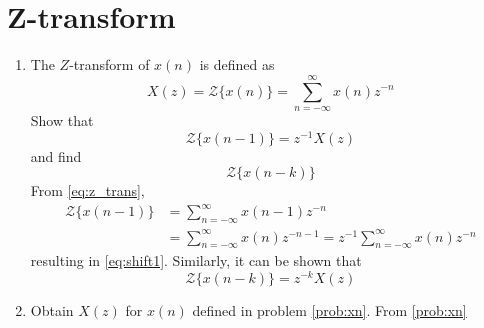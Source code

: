 \documentclass[journal,12pt,twocolumn]{IEEEtran}
\renewcommand\thesection{\arabic{section}}
\begin{document}
\section{Z-transform}
\begin{enumerate}[label=\thesection.\arabic*]
\item The $Z$-transform of $x(n)$ is defined as
%
\begin{equation}
	\label{eq:z_trans}
	X(z)={\mathcal {Z}}\{x(n)\}=\sum _{n=-\infty }^{\infty }x(n)z^{-n}
\end{equation}
%
Show that
\begin{equation}
	\label{eq:shift1}
	{\mathcal {Z}}\{x(n-1)\} = z^{-1}X(z)
\end{equation}
and find
\begin{equation}
	{\mathcal {Z}}\{x(n-k)\} 
\end{equation}
\solution From \eqref{eq:z_trans},
\begin{align}
	{\mathcal {Z}}\{x(n-1)\} &=\sum _{n=-\infty }^{\infty }x(n-1)z^{-n}
	\\
	&=\sum _{n=-\infty }^{\infty }x(n)z^{-n-1} = z^{-1}\sum _{n=-\infty }^{\infty }x(n)z^{-n}
\end{align}
resulting in \eqref{eq:shift1}. Similarly, it can be shown that
%
\begin{equation}
	\label{eq:z_trans_shift}
	{\mathcal {Z}}\{x(n-k)\} = z^{-k}X(z)
\end{equation}

\item 
Obtain $X(z)$ for $x(n)$ defined in problem \eqref{prob:xn}.
\solution From \eqref{prob:xn}\\


\end{enumerate}
\end{document}
